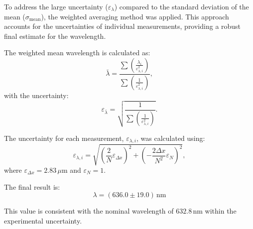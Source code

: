 





To address the large uncertainty (\(\varepsilon_\lambda\)) compared to the standard deviation of the mean (\(\sigma_{\text{mean}}\)), the weighted averaging method was applied. This approach accounts for the uncertainties of individual measurements, providing a robust final estimate for the wavelength.

The weighted mean wavelength is calculated as:
\[
\bar{\lambda} = \frac{\sum \left(\frac{\lambda_i}{\varepsilon_{\lambda,i}^2}\right)}{\sum \left(\frac{1}{\varepsilon_{\lambda,i}^2}\right)},
\]
with the uncertainty:
\[
\varepsilon_{\bar{\lambda}} = \sqrt{\frac{1}{\sum \left(\frac{1}{\varepsilon_{\lambda,i}^2}\right)}}.
\]

The uncertainty for each measurement, \(\varepsilon_{\lambda,i}\), was calculated using:
\[
\varepsilon_{\lambda,i} = \sqrt{\left(\frac{2}{N} \varepsilon_{\Delta x}\right)^2 + \left(-\frac{2 \Delta x}{N^2} \varepsilon_N\right)^2},
\]
where \(\varepsilon_{\Delta x} = 2.83 \, \mu\mathrm{m}\) and \(\varepsilon_N = 1\).

The final result is:
\[
{\lambda} = (636.0 \pm 19.0) \, \text{nm}
\]

This value is consistent with the nominal wavelength of \(632.8 \, \text{nm}\) within the experimental uncertainty.
